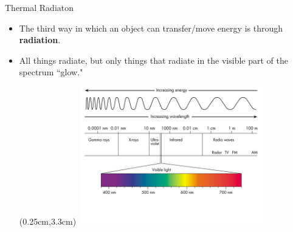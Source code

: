 \documentclass{beamer}
\begin{document}
\begin{frame}[t]{Thermal Radiaton}
\begin{itemize}
   \item The third way in which an object can transfer/move energy is through {\bf radiation}.
   \item<2-> All things radiate, but only things that radiate in the visible part of the spectrum ``glow."
\begin{textblock*}{\textwidth}(0.25cm,3.3cm) %
   \includegraphics[width=8.0cm]{figures/EMspectrum.jpg}
\end{textblock*}
\end{itemize}
\end{frame}
\end{document}
